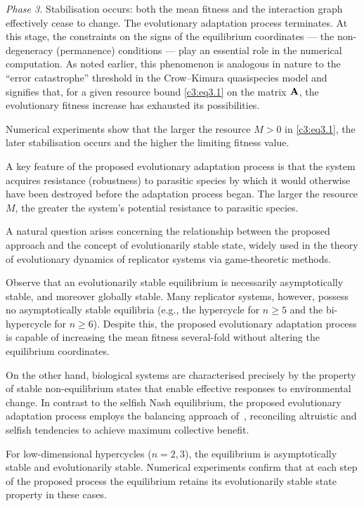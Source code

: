 \documentclass[12pt]{report}
\theoremstyle{definition}
\theoremstyle{remark}
\begin{document}
\textit{Phase 3.} Stabilisation occurs: both the mean fitness and the interaction graph effectively cease to change. The evolutionary adaptation process terminates. At this stage, the constraints on the signs of the equilibrium coordinates --- the non-degeneracy (permanence) conditions --- play an essential role in the numerical computation. As noted earlier, this phenomenon is analogous in nature to the ``error catastrophe'' threshold in the Crow--Kimura quasispecies model and signifies that, for a given resource bound \eqref{c3:eq3.1} on the matrix ${\bf A}$, the evolutionary fitness increase has exhausted its possibilities.

Numerical experiments show that the larger the resource $M > 0$ in \eqref{c3:eq3.1}, the later stabilisation occurs and the higher the limiting fitness value.

A key feature of the proposed evolutionary adaptation process is that the system acquires resistance (robustness) to parasitic species by which it would otherwise have been destroyed before the adaptation process began. The larger the resource $M$, the greater the system's potential resistance to parasitic species.

A natural question arises concerning the relationship between the proposed approach and the concept of evolutionarily stable state, widely used in the theory of evolutionary dynamics of replicator systems via game-theoretic methods.

Observe that an evolutionarily stable equilibrium is necessarily asymptotically stable, and moreover globally stable. Many replicator systems, however, possess no asymptotically stable equilibria (e.g., the hypercycle for $n \geqslant 5$ and the bi-hypercycle for $n \geqslant 6$). Despite this, the proposed evolutionary adaptation process is capable of increasing the mean fitness several-fold without altering the equilibrium coordinates.

On the other hand, biological systems are characterised precisely by the property of stable non-equilibrium states that enable effective responses to environmental change. In contrast to the selfish Nash equilibrium, the proposed evolutionary adaptation process employs the balancing approach of~\cite{c3:Berge1957}, reconciling altruistic and selfish tendencies to achieve maximum collective benefit.

For low-dimensional hypercycles ($n = 2, 3$), the equilibrium is asymptotically stable and evolutionarily stable. Numerical experiments confirm that at each step of the proposed process the equilibrium retains its evolutionarily stable state property in these cases.
\end{document}
